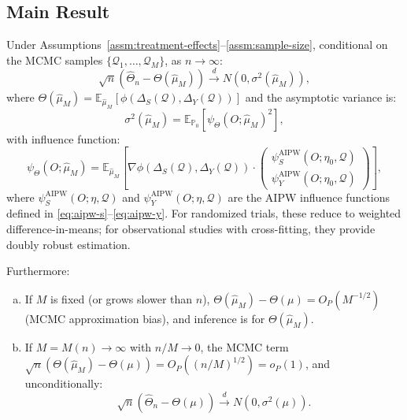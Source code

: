\subsection{Main Result}

\begin{theorem}
\label{thm:asymptotic-normality}
Under Assumptions~\ref{assm:treatment-effects}--\ref{assm:sample-size}, conditional on the MCMC samples $\{\mathcal{Q}_1, \ldots, \mathcal{Q}_M\}$, as $n \to \infty$:
\begin{equation}
\sqrt{n}(\hat{\Theta}_n - \Theta(\hat{\mu}_M)) \xrightarrow{d} N(0, \sigma^2(\hat{\mu}_M)),
\end{equation}
where $\Theta(\hat{\mu}_M) = \mathbb{E}_{\hat{\mu}_M}[\phi(\Delta_S(\mathcal{Q}), \Delta_Y(\mathcal{Q}))]$ and the asymptotic variance is:
\begin{equation}
\sigma^2(\hat{\mu}_M) = \mathbb{E}_{\mathbb{P}_0}[\psi_\Theta(O; \hat{\mu}_M)^2],
\end{equation}
with influence function:
\begin{equation}
\psi_\Theta(O; \hat{\mu}_M) = \mathbb{E}_{\hat{\mu}_M}\left[\nabla\phi(\Delta_S(\mathcal{Q}), \Delta_Y(\mathcal{Q})) \cdot \begin{pmatrix} \psi_S^{\text{AIPW}}(O; \eta_0, \mathcal{Q}) \\ \psi_Y^{\text{AIPW}}(O; \eta_0, \mathcal{Q}) \end{pmatrix}\right],
\end{equation}
where $\psi_S^{\text{AIPW}}(O; \eta, \mathcal{Q})$ and $\psi_Y^{\text{AIPW}}(O; \eta, \mathcal{Q})$ are the AIPW influence functions defined in \eqref{eq:aipw-s}--\eqref{eq:aipw-y}. For randomized trials, these reduce to weighted difference-in-means; for observational studies with cross-fitting, they provide doubly robust estimation.

Furthermore:
\begin{enumerate}[(a)]
\item If $M$ is fixed (or grows slower than $n$), $\Theta(\hat{\mu}_M) - \Theta(\mu) = O_P(M^{-1/2})$ (MCMC approximation bias), and inference is for $\Theta(\hat{\mu}_M)$.
\item If $M = M(n) \to \infty$ with $n/M \to 0$, the MCMC term $\sqrt{n}(\Theta(\hat{\mu}_M) - \Theta(\mu)) = O_P((n/M)^{1/2}) = o_P(1)$, and unconditionally:
\begin{equation}
\sqrt{n}(\hat{\Theta}_n - \Theta(\mu)) \xrightarrow{d} N(0, \sigma^2(\mu)).
\end{equation}
\end{enumerate}
\end{theorem}

